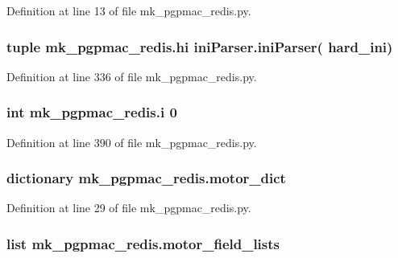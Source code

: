 Definition at line 13 of file mk\-\_\-pgpmac\-\_\-redis.\-py.

\hypertarget{namespacemk__pgpmac__redis_af0e472a4df25fc5c1660ef07226689a8}{
\subsubsection[{hi}]{\setlength{\rightskip}{0pt plus 5cm}tuple mk\-\_\-pgpmac\-\_\-redis.\-hi {\bf ini\-Parser.\-ini\-Parser}( {\bf hard\-\_\-ini})}}\label{namespacemk__pgpmac__redis_af0e472a4df25fc5c1660ef07226689a8}


Definition at line 336 of file mk\-\_\-pgpmac\-\_\-redis.\-py.

\hypertarget{namespacemk__pgpmac__redis_afa643a23a5984fe44c2182ada3dfa401}{
\subsubsection[{i}]{\setlength{\rightskip}{0pt plus 5cm}int mk\-\_\-pgpmac\-\_\-redis.\-i 0}}\label{namespacemk__pgpmac__redis_afa643a23a5984fe44c2182ada3dfa401}


Definition at line 390 of file mk\-\_\-pgpmac\-\_\-redis.\-py.

\hypertarget{namespacemk__pgpmac__redis_ad8583d4fe88c4c98af73d2858c51c660}{
\subsubsection[{motor\-\_\-dict}]{\setlength{\rightskip}{0pt plus 5cm}dictionary mk\-\_\-pgpmac\-\_\-redis.\-motor\-\_\-dict}}\label{namespacemk__pgpmac__redis_ad8583d4fe88c4c98af73d2858c51c660}


Definition at line 29 of file mk\-\_\-pgpmac\-\_\-redis.\-py.

\hypertarget{namespacemk__pgpmac__redis_a7228dc1b6ecec376538db1efe8c05ffb}{
\subsubsection[{motor\-\_\-field\-\_\-lists}]{\setlength{\rightskip}{0pt plus 5cm}list mk\-\_\-pgpmac\-\_\-redis.\-motor\-\_\-field\-\_\-lists}}\label{namespacemk__pgpmac__redis_a7228dc1b6ecec376538db1efe8c05ffb}


